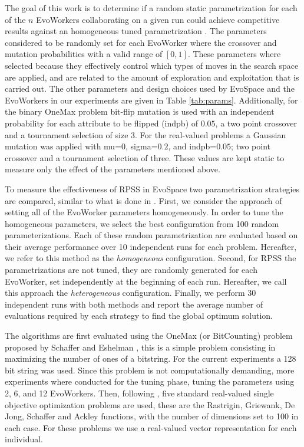 \documentclass{llncs}
\begin{document}
The goal of this work is to determine if a random static parametrization for each of the $n$ EvoWorkers 
collaborating on a given run could achieve competitive results against an homogeneous tuned parametrization
\cite{fuku1,fuku2,garcia2014randomized}. The parameters considered to be randomly set for each EvoWorker 
where the crossover and mutation probabilities with a valid range of $[0,1]$. These parameters where 
selected because they effectively control which types of moves in the search space are
applied, and are related to the amount of exploration and exploitation
that is carried out. %
The other parameters and design choices used by EvoSpace and the EvoWorkers in our experiments are given in 
Table \ref{tab:params}. Additionally, for the binary OneMax problem bit-flip mutation
is used with an independent probability for each attribute to be flipped (indpb) of $0.05$, 
a two point crossover and a tournament selection of size 3. For the real-valued problems a Gaussian
mutation was applied with mu=$0$, sigma=$0.2$, and indpb=$0.05$; two point crossover and
a tournament selection of three. These values are kept static to measure only the effect of the 
parameters mentioned above.



To measure the effectiveness of RPSS in EvoSpace two parametrization strategies are compared, 
similar to what is done in \cite{fuku1,fuku2,garcia2014randomized}. First, we consider the approach of setting all 
of the EvoWorker parameters homogeneously. In order to tune the homogeneous parameters,
we select the best configuration from 100 random parameterizations. 
Each of these random parametrization are evaluated based on their average performance over 10 
independent runs for each problem.
Hereafter, we refer to this method as the {\em homogeneous} configuration. Second, for RPSS the parametrizations
are not tuned, they are randomly generated for each EvoWorker, set independently at the beginning of each run.
Hereafter, we call this approach the {\em heterogeneous} configuration. Finally, we perform 30 independent runs
with both methods and report the average number of evaluations required by each strategy to find the
global optimum solution.

The algorithms are first evaluated using the OneMax (or BitCounting) problem proposed by 
Schaffer and Eshelman \cite{SE91}, this is a simple problem consisting in maximizing the number 
of ones of a bitstring. For the current experiments a 128 bit string was used. Since this
problem is not computationally demanding, more experiments where conducted for the tuning phase, 
tuning the parameters using 2, 6, and 12 EvoWorkers. Then, following \cite{fuku1}, 
five standard real-valued single objective optimization problems 
are used, these are the Rastrigin, Griewank, De Jong, Schaffer  and Ackley functions, 
with the number of dimensions set to 100 in each case. For these problems we use a real-valued vector
representation for each individual.
\end{document}
